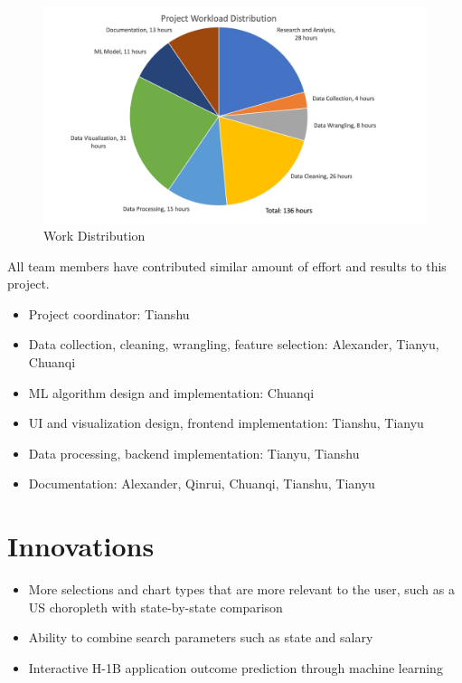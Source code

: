 \documentclass[sigconf]{acmart}
\begin{document}
\begin{figure}
  \includegraphics[width=\linewidth]{fig5_work_distribution.png}
  \caption{Work Distribution}
  \label{fig:workdistribution}
\end{figure}


All team members have contributed similar amount of effort and results to this project.
 
\begin{itemize} 
	\item Project coordinator: Tianshu 
	\item Data collection, cleaning, wrangling, feature selection: Alexander, Tianyu, Chuanqi 
	\item ML algorithm design and implementation: Chuanqi 
	\item UI and visualization design, frontend implementation: Tianshu, Tianyu 
	\item Data processing, backend implementation: Tianyu, Tianshu
	\item Documentation: Alexander, Qinrui, Chuanqi, Tianshu, Tianyu 
	
\end{itemize}


\section{Innovations}
\begin{itemize}
	\item More selections and chart types that are more relevant to the user, such as a US choropleth with state-by-state comparison
	\item Ability to combine search parameters such as state and salary
	\item Interactive H-1B application outcome prediction through machine learning

\end{itemize}
\end{document}
